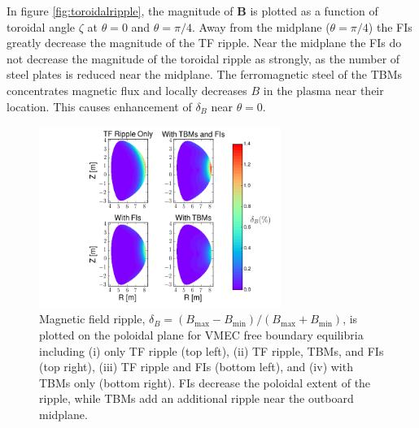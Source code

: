 \documentclass[aip, pop, preprint]{revtex4-1}
\numberwithin{figure}{section}
\numberwithin{equation}{section}
\begin{document}
In figure \ref{fig:toroidalripple}, the magnitude of $\bm{B}$ is plotted as a function of toroidal angle $\zeta$ at $\theta = 0$ and $\theta = \pi/4$. Away from the midplane ($\theta = \pi/4$) the FIs greatly decrease the magnitude of the TF ripple. Near the midplane the FIs do not decrease the magnitude of the toroidal ripple as strongly, as the number of steel plates is reduced near the midplane.\cite{Shinohara2009} The ferromagnetic steel of the TBMs concentrates magnetic flux and locally decreases $B$ in the plasma near their location. This causes enhancement of $\delta_B$  near $\theta = 0$. 
\FloatBarrier

\begin{figure}[h!]
\centering
\includegraphics[width=0.7\textwidth]{ripplecontour.png}
\caption{\label{fig:ripplecontour} Magnetic field ripple, $\delta_B = (B_{\text{max}}-B_{\text{min}})/(B_{\text{max}} + B_{\text{min}})$, is plotted on the poloidal plane for VMEC free boundary equilibria including (i) only TF ripple (top left), (ii) TF ripple, TBMs, and FIs (top right), (iii) TF ripple and FIs (bottom left), and (iv) with TBMs only (bottom right). FIs decrease the poloidal extent of the ripple, while TBMs add an additional ripple near the outboard midplane.}
\end{figure}
\end{document}
